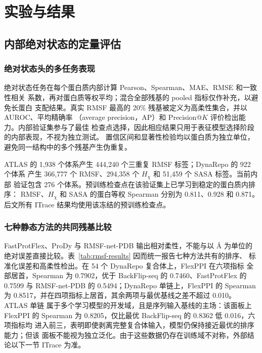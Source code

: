 
\section{实验与结果}

\subsection{内部绝对状态的定量评估}

\subsubsection{绝对状态头的多任务表现}

绝对状态任务在每个蛋白质内部计算 Pearson、Spearman、MAE、RMSE 和一致性相关
系数，再对蛋白质等权平均；混合全部残基的 pooled 指标仅作补充，以避免长蛋白
支配结果。真实 RMSF 最高的 20\% 残基被定义为高柔性集合，并以 AUROC、平均精确率
（average precision，AP）和 Precision@$K$ 评价检出能力。内部验证集参与了最佳
检查点选择，因此相应结果只用于表征模型选择阶段的内部表现，不视为独立测试。
置信区间和显著性检验均以蛋白质为独立单位，避免同一结构中的多个残基产生伪重复。

ATLAS 的 1,938 个体系产生 444,240 个三重复 RMSF 标签；DynaRepo 的 922 个体系
产生 366,777 个 RMSF、294,358 个 $H_\chi$ 和 51,459 个 SASA 标签。当前内部
验证包含 276 个体系。预训练检查点在该验证集上已学习到稳定的蛋白质内排序：
RMSF、$H_\chi$ 和 SASA 的蛋白等权 Spearman 分别为
0.811、0.928 和 0.871。后文所有 ITrace 结果均使用该冻结的预训练检查点。

\subsubsection{七种静态方法的共同残基比较}

FastProtFlex、ProDy 与 RMSF-net-PDB 输出相对柔性，不能与以 \AA{} 为单位的
绝对误差直接比较。表~\ref{tab:rmsf-results} 因而统一报告七种方法共有的排序、
标准化误差和高柔性检出。在 54 个 DynaRepo 复合体上，FlexPPI 在六项指标
全部居首，Spearman 为 0.7902，优于 BackFlip-seq 的 0.7460、FastProtFlex 的
0.7599 与 RMSF-net-PDB 的 0.5494；DynaRepo 单链上，FlexPPI 的 Spearman 为
0.8517，并在四项指标上居首，其余两项与最优基线之差不超过 0.010。ATLAS 单链
属于多个学习模型的开发域，且是序列输入基线的主场：该面板上 FlexPPI 的
Spearman 为 0.8205，仅比最优 BackFlip-seq 的 0.8362 低 0.016，六项指标均
进入前三，表明即使剥离完整复合体输入，模型仍保持接近最优的排序能力；但该
面板不能视为独立泛化。由于这些数据仍存在训练域不对称，外部结论以下一节
ITrace 为准。

